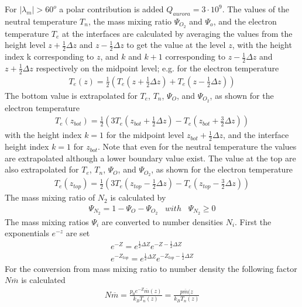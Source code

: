 %
For $|\lambda_m| > 60^o$  a polar contribution is added $Q_{aurora}= 3 \cdot 10^9$.
The values of the neutral temperature $T_n$, the mass mixing ratio $\Psi_{O_2}$ and
$\Psi_o$, and the electron temperature $T_e$ at the interfaces are calculated by averaging
the values from the height level $z+\frac{1}{2}\Delta z$ and $z-\frac{1}{2}\Delta z$ to
get the value at the level $z$, with the height index k corresponding to $z$, and
$k$ and $k+1$ corresponding to $z-\frac{1}{2}\Delta z$ and $z+\frac{1}{2}\Delta z$
respectively on the midpoint level; e.g. for the electron temperature
%
\begin{align}
  T_e(z) = \frac{1}{2} (T_e (z+\frac{1}{2} \Delta z) + T_e(z-\frac{1}{2} \Delta z))
\end{align}
%
The bottom value is extrapolated for $T_e$, $T_n$, $\Psi_O$, and $\Psi_{O_2}$,
as shown for the electron temperature
%
\begin{align}
  T_e(z_{bot}) = \frac{1}{2} (3 T_e (z_{bot}+\frac{1}{2} \Delta z) - T_e(z_{bot}+\frac{3}{2} \Delta z))
\end{align}
%
with the height index $k=1$ for the midpoint level $z_{bot}+\frac{1}{2} \Delta z$,
and the interface height index $k=1$ for $z_{bot}$. Note that even for the
neutral temperature the values are extrapolated although a lower boundary value exist.
The value at the top are also extrapolated for $T_e$, $T_n$, $\Psi_O$, and $\Psi_{O_2}$,
as shown for the electron temperature
%
\begin{align}
  T_e(z_{top}) = \frac{1}{2} (3 T_e (z_{top}-\frac{1}{2} \Delta z) - T_e(z_{top}-\frac{3}{2} \Delta z))
\end{align}
%
The mass mixing ratio of $N_2$ is calculated by
%
\begin{align}
  \Psi_{N_2} = 1 - \Psi_O - \Psi_{O_2} \; \; \; with \; \; \;  \Psi_{N_2} \geq 0
\end{align}
%
The mass mixing ratios $\Psi_i$ are converted to number densities $N_i$.
First the exponentials $e^{-z}$ are set
%
\begin{align}
  e^{-Z} = e^{\frac{1}{2} \Delta Z} e^{-Z -\frac{1}{2} \Delta Z} \\
  e^{-Z_{top}} = e^{\frac{1}{2} \Delta Z} e^{-Z_{top} -\frac{1}{2} \Delta Z}
\end{align}
%
For the conversion from mass mixing ratio to number density the following
factor $N \overline {m}$ is calculated
%
\begin{align}
   N \overline{m} = \frac{p_0 e^{-Z} \overline{m}(z)}{k_B T_n(z)} = \frac{p \overline{m}(z}{k_B T_n(z)}
\end{align}
